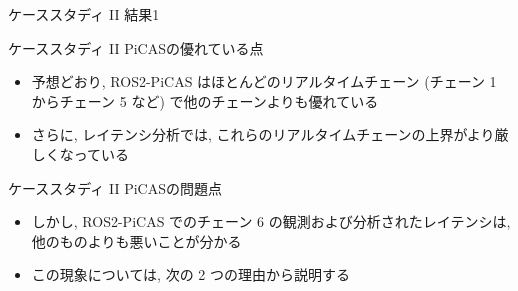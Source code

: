 \begin{frame}{ケーススタディ II 結果1}
\end{frame}


\begin{frame}{ケーススタディ II PiCASの優れている点}
    \begin{itemize}
        \item 予想どおり, ROS2-PiCAS はほとんどのリアルタイムチェーン (チェーン 1 からチェーン 5 など) で他のチェーンよりも優れている
        \item さらに, レイテンシ分析では, これらのリアルタイムチェーンの上界がより厳しくなっている
    \end{itemize}
\end{frame}

\begin{frame}{ケーススタディ II PiCASの問題点}
    \begin{itemize}
        \item しかし, ROS2-PiCAS でのチェーン 6 の観測および分析されたレイテンシは, 他のものよりも悪いことが分かる
        \item この現象については, 次の 2 つの理由から説明する
    \end{itemize}
\end{frame}


